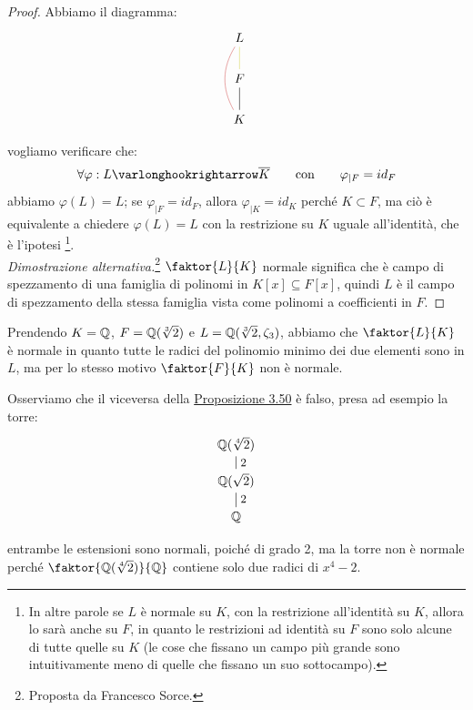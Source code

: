 \documentclass[11pt]{scrartcl}
\begin{document}
\begin{proof}
Abbiamo il diagramma:
\[\begin{tikzcd}
	L \\
	F \\
	K
	\arrow[color={rgb,255:red,214;green,214;blue,92}, no head, from=1-1, to=2-1]
	\arrow[no head, from=2-1, to=3-1]
	\arrow[color={rgb,255:red,214;green,92;blue,92}, bend right, no head, from=1-1, to=3-1]
\end{tikzcd}\]

vogliamo verificare che:
\[ \forall \varphi : L \varlonghookrightarrow \overline K \qquad \text{con} \qquad \varphi_{|F} = id_F
    \]
abbiamo $\varphi(L) = L$; se $\varphi_{|F} = id_F$, allora $\varphi_{|K} = id_K$ perché $K \subset F$, ma ciò è equivalente a chiedere $\varphi(L) = L$ con la restrizione su $K$ uguale all'identità, che è l'ipotesi
\footnote{In altre parole se $L$ è normale su $K$, con la restrizione all'identità su $K$, allora lo sarà anche su $F$, in quanto le restrizioni ad identità su $F$ sono solo alcune di tutte quelle su $K$ (le cose che fissano un campo più grande sono intuitivamente meno di quelle che fissano un suo sottocampo).}.\\
\emph{Dimostrazione alternativa.}\footnote{Proposta da Francesco Sorce.}\; $\faktor{L}{K}$ normale significa che è campo di spezzamento di una famiglia di polinomi in $K[x]\subseteq F[x]$, quindi $L$ è il campo di spezzamento
della stessa famiglia vista come polinomi a coefficienti in $F$.
\end{proof}

\begin{remark}
    Prendendo $K = \mathbb Q$, $F = \mathbb Q(\sqrt[3]{2})$ e $L = \mathbb Q(\sqrt[3]{2},\zeta_3)$, abbiamo che $\faktor{L}{K}$ è normale in quanto tutte le radici del polinomio minimo dei due elementi sono in $L$, ma per lo stesso motivo 
    $\faktor{F}{K}$ non è normale.
\end{remark}

\begin{remark}
    Osserviamo che il viceversa della \hyperref[3.50]{Proposizione 3.50} è falso, presa ad esempio la torre:\
    \[ \begin{tikzpicture}
    \node (Q1) at (0,-1) {$\QQ$};
    \node (Q3) at (0,0) {$\QQ(\sqrt{2})$};
    \node (Q4) at (0,1) {$\QQ(\sqrt[4]{2})$};
    \draw (Q4)--(Q3) node [right, yshift=-0.5cm] {\small$2$};
    \draw (Q1)--(Q3) node [right, yshift=0.5cm] {\small$2$};
    \end{tikzpicture}
        \]
    entrambe le estensioni sono normali, poiché di grado 2, ma la torre non è normale perché $\faktor{\QQ(\sqrt[4]{2})}{\QQ}$ contiene solo due radici di $x^4-2$.
\end{remark}
\end{document}
